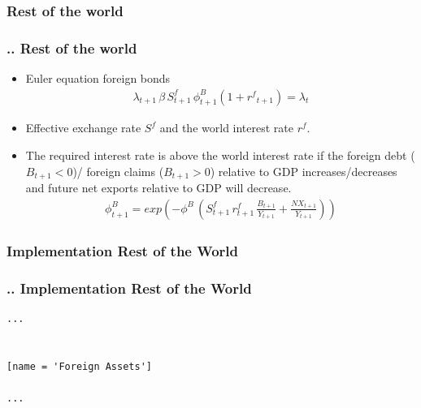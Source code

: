 \documentclass[11pt,aspectratio=169]{beamer}
\begin{document}
\subsubsection{Rest of the world}
\begin{frame}
\frametitle{{\thesection.\thesubsection.\thesubsubsection} Rest of the world}
\scriptsize
\begin{itemize}
\item Euler equation foreign bonds
\begin{align*}
\lambda_{t+1} \, \beta \, S^{f}_{t+1} \, \phi^{B}_{t+1} \left(1+{{r^{f}}_{t+1}}\right) = \lambda_{t}
\end{align*}
\item Effective exchange rate $S^f$ and the world interest rate $r^f$.
\item The required interest rate is above the world interest rate if the foreign debt ($B_{t+1}<0$)/ foreign claims ($B_{t+1}>0$) relative to GDP increases/decreases and future net exports relative to GDP will decrease. 
\begin{align*}
\phi^{B}_{t+1} = exp \left(-\phi^B \,(S^{f}_{t+1} \, r^{f}_{t+1} \, \frac{B_{t+1}}{Y_{t+1}}+\frac{NX_{t+1}}{Y_{t+1}})\right)
\end{align*}
\end{itemize}
\end{frame}

\subsubsection{Implementation Rest of the World}
\begin{frame}[fragile]
\frametitle{{\thesection.\thesubsection.\thesubsubsection} Implementation Rest of the World}

\begin{lstlisting}[frame = single]
...


[name = 'Foreign Assets']

...
\end{lstlisting}
\end{frame}
\end{document}
